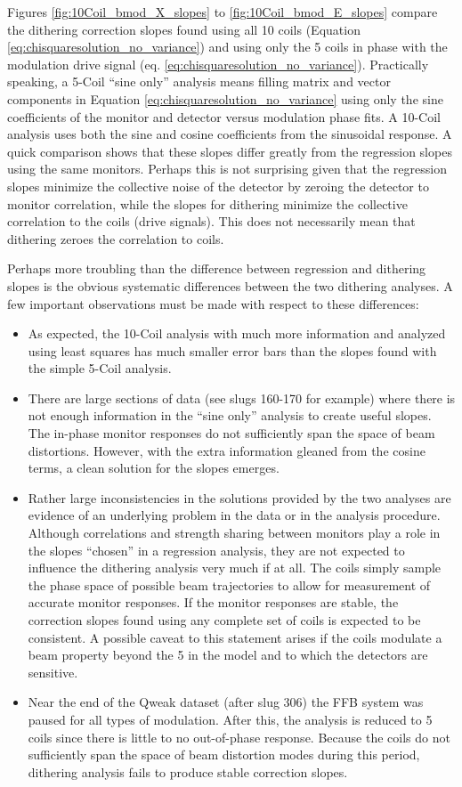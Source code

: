Figures \ref{fig:10Coil_bmod_X_slopes} to \ref{fig:10Coil_bmod_E_slopes} compare the dithering correction slopes found using all 10 coils (Equation \ref{eq:chisquaresolution_no_variance}) and using only the 5 coils in phase with the modulation drive signal (eq. \ref{eq:chisquaresolution_no_variance}). Practically speaking, a 5-Coil ``sine only'' analysis means filling matrix and vector components in Equation \ref{eq:chisquaresolution_no_variance} using only the sine coefficients of the monitor and detector versus modulation phase fits. A 10-Coil analysis uses both the sine and cosine coefficients from the sinusoidal response. A quick comparison shows that these slopes differ greatly from the regression slopes using the same monitors. Perhaps this is not surprising given that the regression slopes minimize the collective noise of the detector by zeroing the detector to monitor correlation, while the slopes for dithering minimize the collective correlation to the coils (drive signals). This does not necessarily mean that dithering zeroes the correlation to coils.

Perhaps more troubling than the difference between regression and dithering slopes is the obvious systematic differences between the two dithering analyses. A few important observations must be made with respect to these differences:
\begin{itemize}
\item{As expected, the 10-Coil analysis with much more information and analyzed using least squares has much smaller error bars than the slopes found with the simple 5-Coil analysis.}
\item{There are large sections of data (see slugs 160-170 for example) where there is not enough information in the ``sine only'' analysis to create useful slopes. The in-phase monitor responses do not sufficiently span the space of beam distortions. However, with the extra information gleaned from the cosine terms, a clean solution for the slopes emerges.}
\item{Rather large inconsistencies in the solutions provided by the two analyses are evidence of an underlying problem in the data or in the analysis procedure. Although correlations and strength sharing between monitors play a role in the slopes ``chosen'' in a regression analysis, they are not expected to influence the dithering analysis very much if at all. The coils simply sample the phase space of possible beam trajectories to allow for measurement of accurate monitor responses. If the monitor responses are stable, the correction slopes found using any complete set of coils is expected to be consistent. A possible caveat to this statement arises if the coils modulate a beam property beyond the 5 in the model and to which the detectors are sensitive.}   
\item{Near the end of the Qweak dataset (after slug 306) the FFB system was paused for all types of modulation. After this, the analysis is reduced to 5 coils since there is little to no out-of-phase response. Because the coils do not sufficiently span the space of beam distortion modes during this period, dithering analysis fails to produce stable correction slopes.}
\end{itemize}

